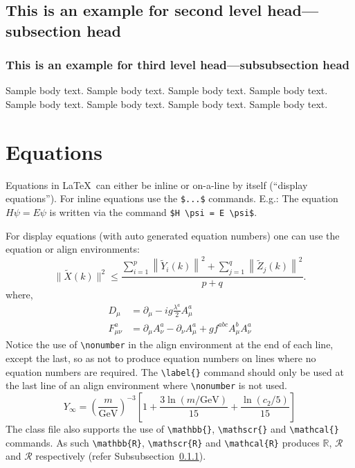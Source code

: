 \documentclass[sn-nature]{sn-jnl}%
\theoremstyle{thmstyleone}%
\theoremstyle{thmstyletwo}%
\theoremstyle{thmstylethree}%
\begin{document}
\subsection{This is an example for second level head---subsection head}\label{subsec2}

\subsubsection{This is an example for third level head---subsubsection head}\label{subsubsec2}

Sample body text. Sample body text. Sample body text. Sample body text. Sample body text. Sample body text. Sample body text. Sample body text. 

\section{Equations}\label{sec4}

Equations in \LaTeX\ can either be inline or on-a-line by itself (``display equations''). For
inline equations use the \verb+$...$+ commands. E.g.: The equation
$H\psi = E \psi$ is written via the command \verb+$H \psi = E \psi$+.

For display equations (with auto generated equation numbers)
one can use the equation or align environments:
\begin{equation}
\|\tilde{X}(k)\|^2 \leq\frac{\sum\limits_{i=1}^{p}\left\|\tilde{Y}_i(k)\right\|^2+\sum\limits_{j=1}^{q}\left\|\tilde{Z}_j(k)\right\|^2 }{p+q}.\label{eq1}
\end{equation}
where,
\begin{align}
D_\mu &=  \partial_\mu - ig \frac{\lambda^a}{2} A^a_\mu \nonumber \\
F^a_{\mu\nu} &= \partial_\mu A^a_\nu - \partial_\nu A^a_\mu + g f^{abc} A^b_\mu A^a_\nu \label{eq2}
\end{align}
Notice the use of \verb+\nonumber+ in the align environment at the end
of each line, except the last, so as not to produce equation numbers on
lines where no equation numbers are required. The \verb+\label{}+ command
should only be used at the last line of an align environment where
\verb+\nonumber+ is not used.
\begin{equation}
Y_\infty = \left( \frac{m}{\textrm{GeV}} \right)^{-3}
    \left[ 1 + \frac{3 \ln(m/\textrm{GeV})}{15}
    + \frac{\ln(c_2/5)}{15} \right]
\end{equation}
The class file also supports the use of \verb+\mathbb{}+, \verb+\mathscr{}+ and
\verb+\mathcal{}+ commands. As such \verb+\mathbb{R}+, \verb+\mathscr{R}+
and \verb+\mathcal{R}+ produces $\mathbb{R}$, $\mathscr{R}$ and $\mathcal{R}$
respectively (refer Subsubsection~\ref{subsubsec2}).
\end{document}
